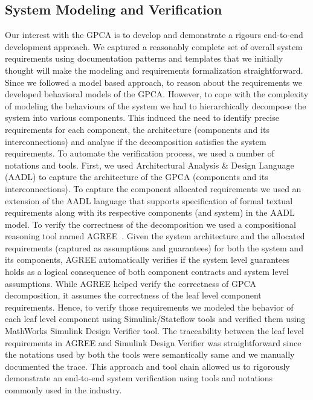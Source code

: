 \subsection {System Modeling and Verification}

Our interest with the GPCA is to develop and demonstrate a rigours end-to-end development approach. We captured a reasonably complete set of overall system requirements using documentation patterns and templates that we initially thought will make the modeling and requirements formalization straightforward. Since we followed a model based approach, to reason about the requirements we developed behavioral models of the GPCA. However, to cope with the complexity of modeling the behaviours of the system we had to hierarchically decompose the system into various components. This induced the need to identify precise requirements for each component, the architecture (components and its interconnections) and analyse if the decomposition satisfies the system requirements. To automate the verification process, we used a number of notations and tools. First, we used Architectural Analysis \& Design Language (AADL) to capture the architecture of the GPCA (components and its interconnections). To capture the component allocated requirements we used an extension of the AADL language that supports specification of formal textual requirements along with its respective components (and system) in the AADL model. To verify the correctness of the decomposition we used a compositional reasoning tool named AGREE~\cite{NFM2012:CoGaMiWhLaLu}. Given the system architecture and the allocated requirements (captured as assumptions and guarantees) for both the system and its components, AGREE automatically verifies if the system level guarantees holds as a logical consequence of both component contracts and system level assumptions. While AGREE helped verify the correctness of GPCA decomposition, it assumes the correctness of the leaf level component requirements. Hence, to verify those requirements we modeled the behavior of each leaf level component using Simulink/Stateflow tools and verified them using MathWorks Simulink Design Verifier tool. The traceability between the leaf level requirements in AGREE and Simulink Design Verifier was straightforward since the notations used by both the tools were semantically same and we manually documented the trace. This approach and tool chain allowed us to rigorously demonstrate an end-to-end system verification using tools and notations commonly used in the industry.

